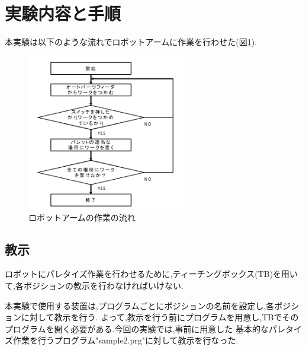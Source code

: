 \documentclass[a4paper,11pt]{jsarticle}
\begin{document}
\section{実験内容と手順}
本実験は以下のような流れでロボットアームに作業を行わせた(図\ref{作業の流れ}).
\begin{figure}[H]
  \begin{center}
    \includegraphics[width = 7cm]{画像/作業の流れ.png}
    \caption{ロボットアームの作業の流れ}
    \label{作業の流れ}
  \end{center}
\end{figure}

\subsection{教示}
ロボットにパレタイズ作業を行わせるために,ティーチングボックス(TB)を用いて,各ポジションの教示を行わなければいけない.
\par
本実験で使用する装置は,プログラムごとにポジションの名前を設定し,各ポジションに対して教示を行う.
よって,教示を行う前にプログラムを用意し,TBでそのプログラムを開く必要がある.今回の実験では,事前に用意した
基本的なパレタイズ作業を行うプログラム"sample2.prg"に対して教示を行なった.
\end{document}
